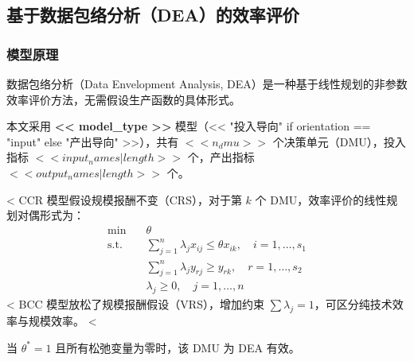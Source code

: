 
\subsection{基于数据包络分析（DEA）的效率评价}

\subsubsection{模型原理}

数据包络分析（Data Envelopment Analysis, DEA）是一种基于线性规划的非参数效率评价方法，无需假设生产函数的具体形式。

本文采用 \textbf{<< model_type >>} 模型（<< "投入导向" if orientation == "input" else "产出导向" >>），共有 $<< n_dmu >>$ 个决策单元（DMU），投入指标 $<< input_names | length >>$ 个，产出指标 $<< output_names | length >>$ 个。

<%
CCR 模型假设规模报酬不变（CRS），对于第 $k$ 个 DMU，效率评价的线性规划对偶形式为：
\begin{equation}
\begin{aligned}
    \min \quad & \theta \\
    \text{s.t.} \quad & \sum_{j=1}^{n} \lambda_j x_{ij} \leq \theta x_{ik}, \quad i = 1, \ldots, s_1 \\
    & \sum_{j=1}^{n} \lambda_j y_{rj} \geq y_{rk}, \quad r = 1, \ldots, s_2 \\
    & \lambda_j \geq 0, \quad j = 1, \ldots, n
\end{aligned}
\label{eq:dea_ccr}
\end{equation}
<%
BCC 模型放松了规模报酬假设（VRS），增加约束 $\sum \lambda_j = 1$，可区分纯技术效率与规模效率。
<%

当 $\theta^* = 1$ 且所有松弛变量为零时，该 DMU 为 DEA 有效。

